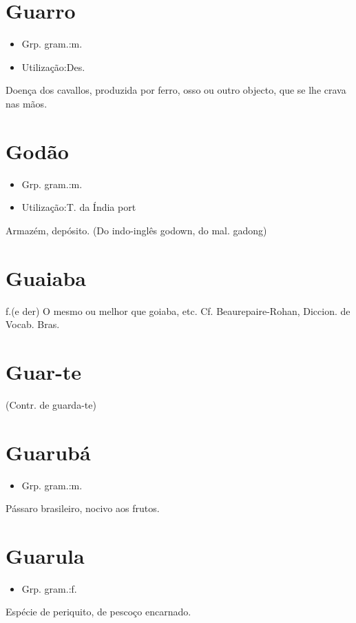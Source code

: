\section{Guarro}
\begin{itemize}
\item {Grp. gram.:m.}
\end{itemize}
\begin{itemize}
\item {Utilização:Des.}
\end{itemize}
Doença dos cavallos, produzida por ferro, osso ou outro objecto, que se lhe crava nas mãos.
\section{Godão}
\begin{itemize}
\item {Grp. gram.:m.}
\end{itemize}
\begin{itemize}
\item {Utilização:T. da Índia port}
\end{itemize}
Armazém, depósito.
(Do indo-inglês \textunderscore godown\textunderscore , do mal. \textunderscore gadong\textunderscore )
\section{Guaiaba}
\textunderscore f.\textunderscore  (e der)
O mesmo ou melhor que \textunderscore goiaba\textunderscore , etc. Cf. Beaurepaire-Rohan, \textunderscore Diccion. de Vocab. Bras\textunderscore .
\section{Guar-te}
(Contr. de \textunderscore guarda-te\textunderscore )
\section{Guarubá}
\begin{itemize}
\item {Grp. gram.:m.}
\end{itemize}
Pássaro brasileiro, nocivo aos frutos.
\section{Guarula}
\begin{itemize}
\item {Grp. gram.:f.}
\end{itemize}
Espécie de periquito, de pescoço encarnado.
